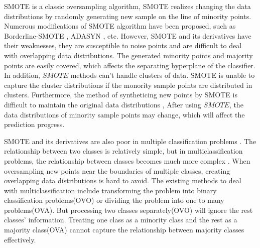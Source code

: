 \documentclass[runningheads]{llncs}
\begin{document}
SMOTE is a classic oversampling algorithm,
SMOTE realizes changing the data distributions by randomly generating new sample 
on the line of minority points.
Numerous modifications of SMOTE algorithm have been proposed, such as
Borderline-SMOTE \cite{2005Borderline}, ADASYN \cite{2008ADASYN}, etc. 
However, SMOTE and its derivatives have their weaknesses,
they are susceptible to noise points and are difficult to deal with
 overlapping data distributions.
The generated minority points and majority points are easily covered, 
which affects the separating hyperplane of the classifier. 
In addition, $SMOTE$ methods can't handle
clusters of data. SMOTE is unable to capture the cluster distributions
if the monority sample points are distributed in clusters.
Furthermore,
the method of syntheticing new points by SMOTE is difficult to 
maintain the original data distributions \cite{2008DATA},
After using $SMOTE$, 
the data distributions of minority sample points may change,
which will affect the prediction progress.


 SMOTE and its derivatives are also poor in multiple classification problems \cite{2020Combined}. 
 The relationship between two classes is relatively simple,
but in multiclassification problems, the relationship 
between classes becomes much more complex \cite{2017Relevance}.
When oversampling new points near the boundaries of multiple classes, 
creating overlapping data distributions \cite{Jierui2013Overlapping} is hard to avoid.
The existing methods to deal with multiclassification include transforming 
the problem into binary classification problems(OVO) \cite{articlemulti} or 
dividing the problem into one to many problems(OVA).
But processing two classes separately(OVO) will ignore the rest classes' information.
Treating one class as a minority class and the rest as a majority class(OVA)
cannot capture the relationship between majority classes effectively.
\end{document}
